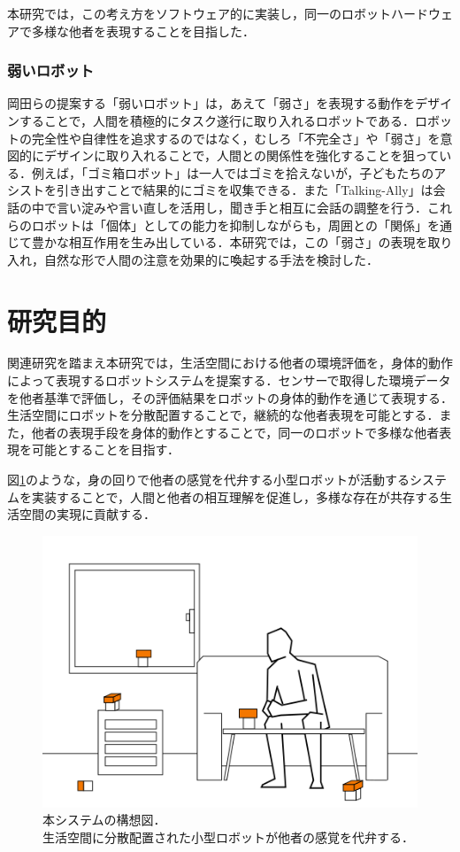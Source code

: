 \documentclass{cuxarticle}
\begin{document}
本研究では，この考え方をソフトウェア的に実装し，同一のロボットハードウェアで多様な他者を表現することを目指した．

\subsubsection{弱いロボット}
岡田らの提案する「弱いロボット」\cite{岡田-2017-弱いロボ}は，あえて「弱さ」を表現する動作をデザインすることで，人間を積極的にタスク遂行に取り入れるロボットである．ロボットの完全性や自律性を追求するのではなく，むしろ「不完全さ」や「弱さ」を意図的にデザインに取り入れることで，人間との関係性を強化することを狙っている．例えば，「ゴミ箱ロボット」\cite{岡田美智男-2012-ゴミ箱ロ}は一人ではゴミを拾えないが，子どもたちのアシストを引き出すことで結果的にゴミを収集できる．また「Talking-Ally」\cite{岡田美智男-2012-ゴミ箱ロ}は会話の中で言い淀みや言い直しを活用し，聞き手と相互に会話の調整を行う．これらのロボットは「個体」としての能力を抑制しながらも，周囲との「関係」を通じて豊かな相互作用を生み出している．本研究では，この「弱さ」の表現を取り入れ，自然な形で人間の注意を効果的に喚起する手法を検討した．

\section{研究目的}
関連研究を踏まえ本研究では，生活空間における他者の環境評価を，身体的動作によって表現するロボットシステムを提案する．センサーで取得した環境データを他者基準で評価し，その評価結果をロボットの身体的動作を通じて表現する．生活空間にロボットを分散配置することで，継続的な他者表現を可能とする．また，他者の表現手段を身体的動作とすることで，同一のロボットで多様な他者表現を可能とすることを目指す．

図\ref{fig:system-concept}のような，身の回りで他者の感覚を代弁する小型ロボットが活動するシステムを実装することで，人間と他者の相互理解を促進し，多様な存在が共存する生活空間の実現に貢献する．

\begin{figure}[h]
  \centering
  \includegraphics[keepaspectratio,height=0.2\textheight]{resources/robot-in-house.png}
  \caption[short]{本システムの構想図．\\生活空間に分散配置された小型ロボットが他者の感覚を代弁する．}
  \label{fig:system-concept}
\end{figure}
\end{document}
